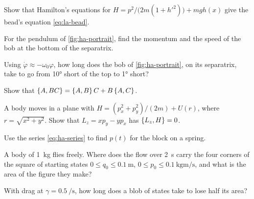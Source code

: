 \begin{exercise}
\label{ex:ha-bead}
Show that Hamilton's equations for $H = p^2/\bigl(2m(1 + h'^2)\bigr) +
mgh(x)$ give the bead's equation \cref{eq:la-bead}.
\end{exercise}

\begin{exercise}
\label{ex:ha-separatrix}
For the pendulum of \cref{fig:ha-portrait}, find the momentum and the
speed of the bob at the bottom of the separatrix.
\end{exercise}

\begin{exercise}
\label{ex:ha-creep}
Using $\dot\varphi \approx -\omega_0\varphi$, how long does the bob of
\cref{fig:ha-portrait}, on its separatrix, take to go from \ang{10} short
of the top to \ang{1} short?
\end{exercise}

\begin{exercise}
\label{ex:ha-product}
Show that $\{A, BC\} = \{A, B\}\,C + B\,\{A, C\}$.
\end{exercise}

\begin{exercise}
\label{ex:ha-lz}
A body moves in a plane with $H = (p_x^2 + p_y^2)/(2m) + U(r)$, where $r
= \sqrt{x^2 + y^2}$. Show that $L_z = xp_y - yp_x$ has $\{L_z, H\} = 0$.
\end{exercise}

\begin{exercise}
\label{ex:ha-spring-p}
Use the series \cref{eq:ha-series} to find $p(t)$ for the block on a
spring.
\end{exercise}

\begin{exercise}[a shear]
\label{ex:ha-shear}
A body of \SI{1}{\kilogram} flies freely. Where does the flow over
\SI{2}{\second} carry the four corners of the square of starting states
$0 \le q_0 \le \SI{0.1}{\metre}$, $0 \le p_0 \le
\SI{0.1}{\kilogram\metre\per\second}$, and what is the area of the
figure they make?
\end{exercise}

\begin{exercise}
\label{ex:ha-halving}
With drag at $\gamma = \SI{0.5}{\per\second}$, how long does a blob of
states take to lose half its area?
\end{exercise}

